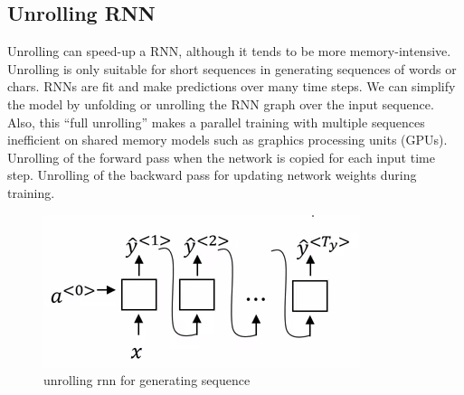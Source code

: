\subsection{Unrolling RNN}
Unrolling can speed-up a RNN, although it tends to be more memory-intensive. Unrolling is only suitable for short sequences in generating sequences of words or chars.
RNNs are fit and make predictions over many time steps. We can simplify the model by unfolding or unrolling the RNN graph over the input sequence. Also, this “full unrolling” makes a parallel training with multiple sequences inefficient on shared memory models such as graphics processing units (GPUs).\cite{web014} Unrolling of the forward pass when the network is copied for each input time step. Unrolling of the backward pass for updating network weights during training.
  \begin{figure}[H]%
    \center%
    \includegraphics[width=\textwidth]{images/amir/unroll_rnn.png}
    \caption[This is a unrolling rnn image]{unrolling rnn for generating sequence}\label{fig:unrolling rnn}%
  \end{figure}